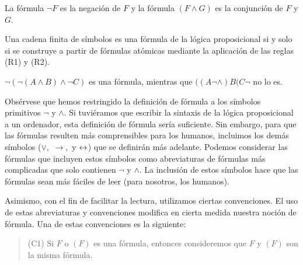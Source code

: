 \documentclass[12pt,a4paper]{book}
\begin{document}
    \begin{definicion}
        La fórmula $\neg F$ es la negación de $F$ y la fórmula $(F\wedge G)$ es la conjunción de $F$ y $G$.
    \end{definicion}

    \begin{definicion}
        Una cadena finita de símbolos es una fórmula de la lógica proposicional si y solo si se construye a partir de fórmulas atómicas
        mediante la aplicación de las reglas (R1) y (R2).
    \end{definicion}

    \begin{ejemplo}
        $\neg(\neg(A\wedge B)\wedge\neg C)$ es una fórmula, mientras que $((A\neg\wedge)B(C\neg$ no lo es.
    \end{ejemplo}

    Obsérvese que hemos restringido la definición de fórmula a los símbolos primitivos $\neg$ y $\wedge$. Si tuviéramos que escribir
    la sintaxis de la lógica proposicional a un ordenador, esta definición de fórmula sería suficiente. Sin embargo, para que las fórmulas
    resulten más comprensibles para los humanos, incluimos los demás símbolos ($\vee,$ $\rightarrow,$ y $\leftrightarrow$) que se definirán más adelante.
    Podemos considerar las fórmulas que incluyen estos símbolos como abreviaturas de fórmulas más complicadas que solo contienen 
    $\neg$ y $\wedge$. La inclusión de estos símbolos hace que las fórmulas sean más fáciles de leer (para nosotros, los humanos).

    \vspace{2cm}

    Asimismo, con el fin de facilitar la lectura, utilizamos ciertas convenciones. El uso de estas abreviaturas y convenciones modifica
    en cierta medida nuestra noción de fórmula. Una de estas convenciones es la siguiente:

    \begin{quote}
        (C1) Si $F$ o $(F)$ es una fórmula, entonces consideremos que $F$ y $(F)$ son la misma fórmula.
    \end{quote}
\end{document}
